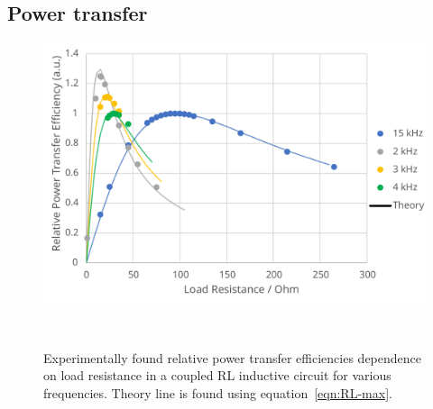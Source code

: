 \documentclass[11pt]{iopart}
\begin{document}
\subsection{Power transfer}

\begin{figure}
  \begin{center}
\hspace*{-2em}
  \begin{minipage}{0.5\linewidth}
   \noindent\includegraphics[width=\linewidth]{images/RL-Rpeaks.pdf}
  \end{minipage}
  ~~~
  \begin{minipage}{0.38\linewidth}
    \hspace*{-4em}\caption{}
    \small Experimentally found relative power transfer efficiencies
    dependence on load resistance in a coupled RL inductive circuit for
    various frequencies. Theory line is found using
    equation~\ref{eqn:RL-max}. \label{fig:RL-R}
  \end{minipage}
  \end{center}
\end{figure}
\end{document}
